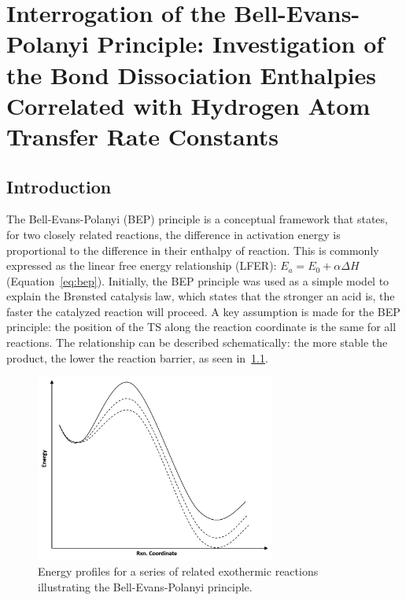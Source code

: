 
\chapter{Interrogation of the Bell-Evans-Polanyi Principle: Investigation of the Bond Dissociation Enthalpies Correlated with Hydrogen Atom Transfer Rate Constants}
\label{ch:bde}

\section{Introduction}

The Bell-Evans-Polanyi (BEP) principle is a conceptual framework that states, for two closely related reactions, the difference in activation energy is proportional to the difference in their enthalpy of reaction.\cite{Bell1936,Evans1938,Dill2003} This is commonly expressed as the linear free energy relationship (LFER): $E_a = E_0 + \alpha \Delta H$ (Equation~\ref{eq:bep}). Initially, the BEP principle was used as a simple model to explain the Br{\o}nsted catalysis law, which states that the stronger an acid is, the faster the catalyzed reaction will proceed.\cite{Bronsted1924} A key assumption is made for the BEP principle: the position of the TS along the reaction coordinate is the same for all reactions. The relationship can be described schematically: the more stable the product, the lower the reaction barrier, as seen in~\ref{fig:bep}.

\begin{figure}[!htbp]
  \centering
  \includegraphics[width=0.7\textwidth]{figures/bep}
  \caption{Energy profiles for a series of related exothermic reactions illustrating the Bell-Evans-Polanyi principle.}
\label{fig:bep}
\end{figure}

